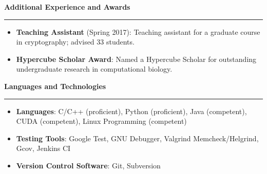 \documentclass[10pt,letterpaper]{article}
\begin{document}
\medskip

\begin{large}
    \textbf{Additional Experience and Awards}
\end{large}

\smallskip \hrule \smallskip

\begin{itemize}[topsep=0pt]
    \setlength\itemsep{0.1em}
    \item \textbf{Teaching Assistant} (Spring 2017): Teaching assistant for a
          graduate course in cryptography; advised 33 students.
    \item \textbf{Hypercube Scholar Award}: Named a Hypercube Scholar for
          outstanding undergraduate research in computational biology.
\end{itemize}

\medskip

\begin{large}
    \textbf{Languages and Technologies}
\end{large}

\smallskip \hrule \smallskip

\begin{itemize}[topsep=0pt]
    \setlength\itemsep{0.1em}
    \item \textbf{Languages}: C/C++ (proficient),
          Python (proficient), Java (competent), CUDA (competent),
          Linux Programming (competent)
    \item \textbf{Testing Tools}: Google Test, GNU Debugger, Valgrind
          Memcheck/Helgrind, Gcov, Jenkins CI
    \item \textbf{Version Control Software}: Git, Subversion
\end{itemize}
\end{document}
